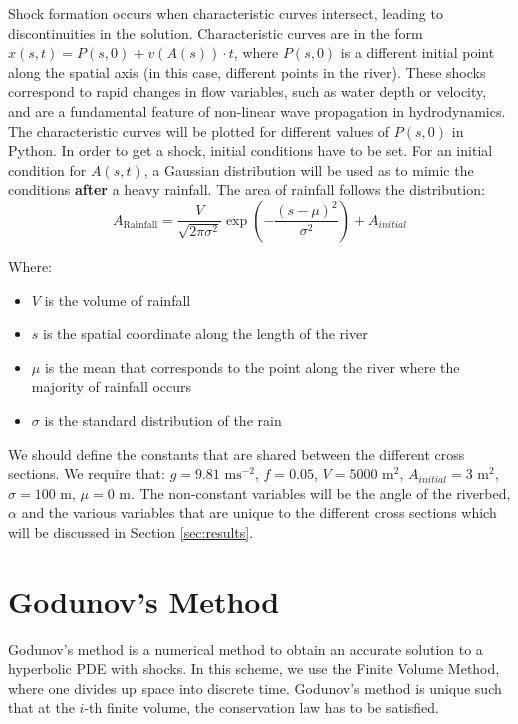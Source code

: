 \documentclass[12pt]{article}
\begin{document}
Shock formation occurs when characteristic curves intersect, leading to discontinuities in the solution. Characteristic curves are in the form $ x(s, t) = P(s, 0) + v(A(s))\cdot t$, where $P(s, 0)$ is a different initial point along the spatial axis (in this case, different points in the river). These shocks correspond to rapid changes in flow variables, such as water depth or velocity, and are a fundamental feature of non-linear wave propagation in hydrodynamics. The characteristic curves will be plotted for different values of $P(s, 0)$ in Python. In order to get a shock, initial conditions have to be set. For an initial condition for $A(s, t)$, a Gaussian distribution will be used as to mimic the conditions \textbf{after} a heavy rainfall. The area of rainfall follows the distribution:
\begin{equation}
     A_\text{Rainfall} = \frac{V}{\sqrt{2\pi\sigma^2}}\exp{\left(-\frac{(s - \mu)^2}{\sigma^2}\right)} + A_{initial}
\end{equation}

Where:
\begin{itemize}
    \item $V$ is the volume of rainfall
    \item $s$ is the spatial coordinate along the length of the river
    \item $\mu$ is the mean that corresponds to the point along the river where the majority of rainfall occurs
    \item $\sigma$ is the standard distribution of the rain
\end{itemize}

We should define the constants that are shared between the different cross sections. We require that: $g = 9.81 \text{ ms}^{-2}$, $f = 0.05$, $V = 5000\text{ m}^2$, $A_{initial} = 3 \text{ m}^2$, $\sigma = 100\text{ m}$, $\mu = 0\text{ m}$. The non-constant variables will be the angle of the riverbed, $\alpha$ and the various variables that are unique to the different cross sections which will be discussed in Section \ref{sec:results}.

\section{Godunov's Method}
Godunov's method is a numerical method to obtain an accurate solution to a hyperbolic PDE with shocks. In this scheme, we use the Finite Volume Method, where one divides up space into discrete time. Godunov's method is unique such that at the $i$-th finite volume, the conservation law has to be satisfied.
\end{document}
